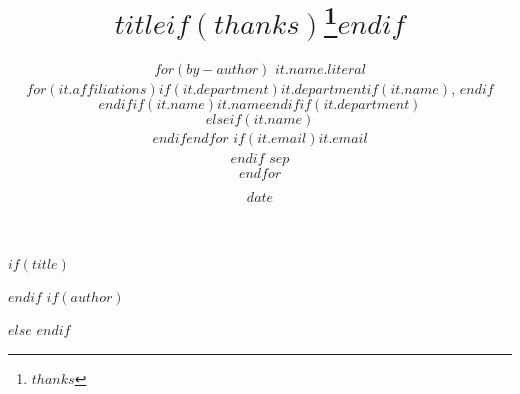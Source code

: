 $if(title)$
\title{$title$$if(thanks)$\thanks{$thanks$}$endif$}
$endif$
$if(author)$
\author{
$for(by-author)$
$it.name.literal$\\
$for(it.affiliations)$$if(it.department)$$it.department$$if(it.name)$, $endif$\\$endif$$if(it.name)$$it.name$$endif$$if(it.department)$\\$elseif(it.name)$\\$endif$$endfor$
$if(it.email)${\tt \href{mailto:$it.email$}{$it.email$}}\\$endif$
$sep$\\\And
$endfor$}
$else$\vspace{-1in}
$endif$
\date{$date$}



